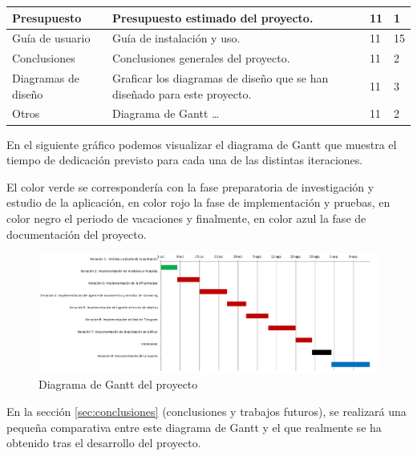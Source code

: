 \begin{table}[h!]
\begin{tabular}{|p{4cm}|p{7.2cm}|p{1.3cm}|p{2.1cm}|}
Presupuesto                        & Presupuesto estimado del proyecto.
          & 11                             & 1                                  \\ \hline          

Guía de usuario                        & Guía de instalación y uso.
          & 11                             & 15                                  \\ \hline

Conclusiones                        & Conclusiones generales del proyecto.
          & 11                             & 2                                  \\ \hline

Diagramas de diseño                        & Graficar los diagramas de diseño que se han diseñado para este proyecto.
          & 11                             & 3                                  \\ \hline

Otros                    & Diagrama de Gantt \ldots 
          & 11                             & 2                                  \\ \hline

\end{tabular}
\end{table}

\newpage

En el siguiente gráfico podemos visualizar el diagrama de Gantt que muestra el tiempo de dedicación previsto para cada una de las distintas iteraciones.

El color verde se correspondería con la fase preparatoria de investigación y estudio de la aplicación, en color rojo la fase de implementación y pruebas, en color negro el periodo de vacaciones y finalmente, en color azul la fase de documentación del proyecto.

\begin{figure}[h]
	\centering
	\includegraphics[scale=0.45]{images/diagrama_gantt}
	\caption{Diagrama de Gantt del proyecto}
\end{figure}

En la sección \ref{sec:conclusiones} (conclusiones y trabajos futuros), se realizará una pequeña comparativa entre este diagrama de Gantt y el que realmente se ha obtenido tras el desarrollo del proyecto.
